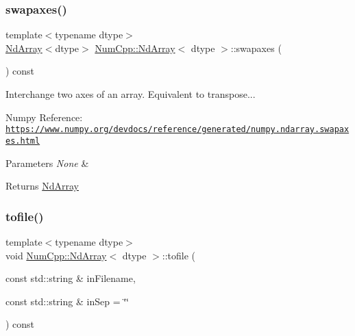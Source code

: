 \subsubsection{\texorpdfstring{swapaxes()}{swapaxes()}}
{\footnotesize\ttfamily template$<$typename dtype$>$ \\
\mbox{\hyperlink{class_num_cpp_1_1_nd_array}{Nd\+Array}}$<$dtype$>$ \mbox{\hyperlink{class_num_cpp_1_1_nd_array}{Num\+Cpp\+::\+Nd\+Array}}$<$ dtype $>$\+::swapaxes (\begin{DoxyParamCaption}{ }\end{DoxyParamCaption}) const\hspace{0.3cm}{\ttfamily [inline]}}

Interchange two axes of an array. Equivalent to transpose...

Numpy Reference\+: \href{https://www.numpy.org/devdocs/reference/generated/numpy.ndarray.swapaxes.html}{\tt https\+://www.\+numpy.\+org/devdocs/reference/generated/numpy.\+ndarray.\+swapaxes.\+html}


\begin{DoxyParams}{Parameters}
{\em None} & \\
\hline
\end{DoxyParams}
\begin{DoxyReturn}{Returns}
\mbox{\hyperlink{class_num_cpp_1_1_nd_array}{Nd\+Array}} 
\end{DoxyReturn}
\mbox{\label{class_num_cpp_1_1_nd_array_ab0c57367e4bb1ba6da16179ce17e2bbe}} 
\subsubsection{\texorpdfstring{tofile()}{tofile()}}
{\footnotesize\ttfamily template$<$typename dtype$>$ \\
void \mbox{\hyperlink{class_num_cpp_1_1_nd_array}{Num\+Cpp\+::\+Nd\+Array}}$<$ dtype $>$\+::tofile (\begin{DoxyParamCaption}\item[{const std\+::string \&}]{in\+Filename,  }\item[{const std\+::string \&}]{in\+Sep = {\ttfamily \char`\"{}\char`\"{}} }\end{DoxyParamCaption}) const\hspace{0.3cm}{\ttfamily [inline]}}

